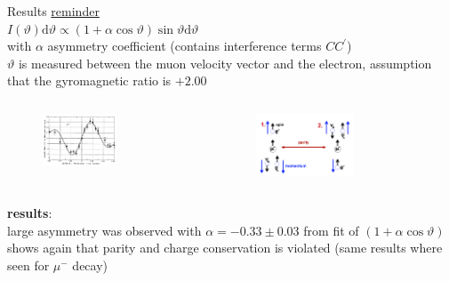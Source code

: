 \documentclass[aspectratio=1610, 10pt]{beamer}
\begin{document}
\begin{frame}{Results}
	\underline{reminder}\\
	\vspace{0.2cm}
	$I(\vartheta) \text{d}\vartheta \propto (1 + \alpha \cos\vartheta)\sin\vartheta \text{d}\vartheta$\\
	with $\alpha$ asymmetry coefficient (contains interference terms $CC^{'}$)\\
	$\vartheta$ is measured between the muon velocity vector and the electron, assumption that the gyromagnetic ratio is $+2.00$\\
	\begin{columns}
		\begin{figure}
			\includegraphics[width=0.6\textwidth]{images/result_muon.png}
		\end{figure}
		\begin{figure}
			\includegraphics[width=0.6\textwidth]{images/muon_decay.png}
		\end{figure}
	\end{columns}
	\nocite{muon}
	\textbf{results}: \\
	large asymmetry was observed with $\alpha = -0.33 \pm 0.03$ from fit of $(1 + \alpha \cos\vartheta)$\\
	\textrightarrow shows again that parity and charge conservation is violated (same results where seen for $\mu^{-}$ decay)
\end{frame}
\end{document}
